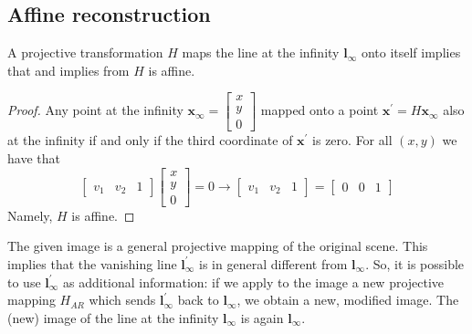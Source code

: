 \documentclass[12pt, a4paper]{report}
\newtheorem[style=M,bodystyle=\normalfont]{theorem}{Theorem}
\newtheorem[style=M,bodystyle=\normalfont]{corollary}{Corollary}
\newtheorem[style=M,bodystyle=\normalfont]{lemma}{Lemma}
\newtheorem[style=M,bodystyle=\normalfont]{definition}{Definition}
\begin{document}
    \subsection{Affine reconstruction}
    \begin{theorem}
        A projective transformation $H$ maps the line at the infinity $\boldsymbol{l}_{\infty}$ onto itself implies that and implies from $H$ is affine. 
    \end{theorem}
    \begin{proof}
        Any point at the infinity $\boldsymbol{x}_{\infty}=\begin{bmatrix} x \\ y \\ 0 \end{bmatrix}$ mapped onto a point 
        $\boldsymbol{x}^{'}=H\boldsymbol{x}_{\infty}$ also at the infinity if and only if the third coordinate of $\boldsymbol{x}^{'}$ is 
        zero. For all $(x,y)$ we have that 
        \[\begin{bmatrix} v_1 & v_2 & 1 \end{bmatrix} \begin{bmatrix} x \\ y \\ 0 \end{bmatrix}=0 \rightarrow \begin{bmatrix} v_1 & v_2 & 1 \end{bmatrix} = \begin{bmatrix} 0 & 0 & 1 \end{bmatrix}\]
        Namely, $H$ is affine.
    \end{proof}
    The given image is a general projective mapping of the original scene. This implies that the vanishing line $\boldsymbol{l}^{'}_{\infty}$
    is in general different from  $\boldsymbol{l}_{\infty}$. So, it is possible to use $\boldsymbol{l}^{'}_{\infty}$ as additional 
    information: if we apply to the image a new projective mapping $H_{AR}$ which sends $\boldsymbol{l}^{'}_{\infty}$ back to 
    $\boldsymbol{l}_{\infty}$, we obtain a new, modified image. The (new) image of the line at the infinity $\boldsymbol{l}_{\infty}$ is 
    again $\boldsymbol{l}_{\infty}$. 
\end{document}
